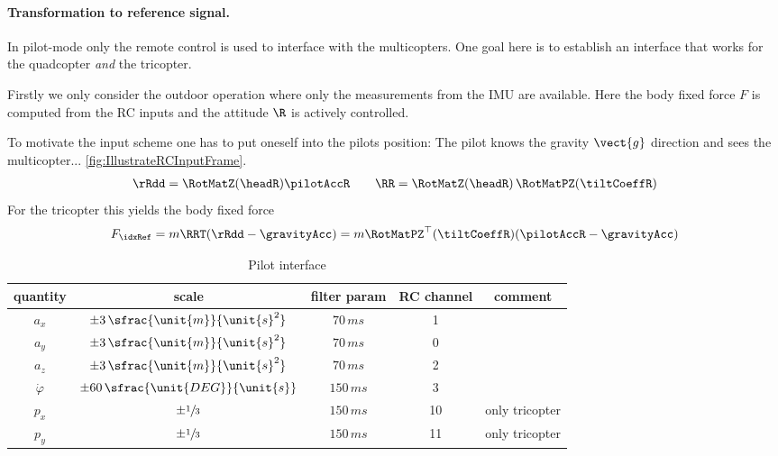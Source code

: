 % 


\paragraph{Transformation to reference signal.}
In pilot-mode only the remote control is used to interface with the multicopters.
One goal here is to establish an interface that works for the quadcopter \textit{and} the tricopter.

Firstly we only consider the outdoor operation where only the measurements from the IMU are available.
Here the body fixed force $F$ is computed from the RC inputs and the attitude $\R$ is actively controlled. 

To motivate the input scheme one has to put oneself into the pilots position:
The pilot knows the gravity $\vect{g}$ direction and sees the multicopter... \autoref{fig:IllustrateRCInputFrame}.
\begin{align}
 \rRdd = \RotMatZ(\headR) \pilotAccR
\qquad
 \RR = \RotMatZ(\headR)\, \RotMatPZ(\tiltCoeffR)
\end{align}
For the tricopter this yields the body fixed force
\begin{align}
 F_{\idxRef} = m \RRT (\rRdd - \gravityAcc) = m \RotMatPZ^\top(\tiltCoeffR) (\pilotAccR - \gravityAcc)
\end{align}



\begin{table}[ht]
\centering
\begin{tabular}{ccccc}
 \toprule
 quantity & scale & filter param & RC channel & comment\\
 \midrule
 $a_x$ & $\pm 3\,\sfrac{\unit{m}}{\unit{s}^2}$ & $70\,\unit{ms}$ & 1 \\
 $a_y$ & $\pm 3\,\sfrac{\unit{m}}{\unit{s}^2}$ & $70\,\unit{ms}$ & 0 \\
 $a_z$ & $\pm 3\,\sfrac{\unit{m}}{\unit{s}^2}$ & $70\,\unit{ms}$ & 2 \\
 $\dot{\varphi}$ & $\pm 60\,\sfrac{\unit{DEG}}{\unit{s}}$ & $150\,\unit{ms}$ & 3 \\
 $p_x$ & $\pm \sfrac{1}{3}$ & $150\,\unit{ms}$ & 10 & only tricopter \\
 $p_y$ & $\pm \sfrac{1}{3}$ & $150\,\unit{ms}$ & 11 & only tricopter \\
 \bottomrule
\end{tabular}
\caption{Pilot interface}
\label{tab:PilotInterface}
\end{table}


